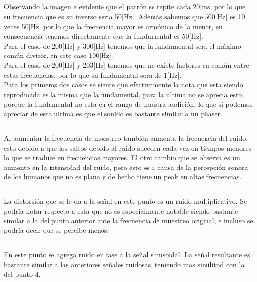\documentclass[11pt, letterpaper, titlepage]{article}
\begin{document}
\subsection{}
Observando la imagen e evidente que el patrón se repite cada 20[ms] por lo que su frecuencia que es su inverso seria 50[Hz]. Además sabemos que 500[Hz] es 10 veces 50[Hz] por lo que la frecuencia mayor es armónico de la menor, en consecuencia tenemos directamente que la fundamental es 50[Hz].\\
Para el caso de 200[Hz] y 300[Hz] tenemos que la fundamental sera el máximo común divisor, en este caso 100[Hz].\\
Para el caso de 200[Hz] y 203[Hz] tenemos que no existe factores en común entre estas frecuencias, por lo que su fundamental sera de 1[Hz].\\
Para los primeros dos casos se siente que efectivamente la nota que esta siendo reproducida es la misma que la fundamental, para la ultima no se aprecia esto porque la fundamental no esta en el rango de nuestra audición, lo que si podemos apreciar de esta ultima es que el sonido es bastante similar a un phaser.

\subsection{}
Al aumentar la frecuencia de muestreo también aumenta la frecuencia del ruido, esto debido a que los saltos debido al ruido suceden cada vez en tiempos menores lo que se traduce en frecuencias mayores. El otro cambio que se observa es un aumento en la intensidad del ruido, pero esto es a causa de la percepción sonora de los humanos que no es plana y de hecho tiene un peak en altas frecuencias.
\newpage
\subsection{}
La distorsión que se le da a la señal en este punto es un ruido multiplicativo.
Se podría notar respecto a esta que no es especialmente notable siendo bastante similar a la del punto anterior ante la frecuencia de muestreo original, e incluso se podría decir que se percibe menos.
\subsection{}
En este punto se agrega ruido en fase a la señal sinusoidal.
La señal resultante es bastante similar a las anteriores señales ruidosas, teniendo mas similitud con la del punto 4.
\end{document}
